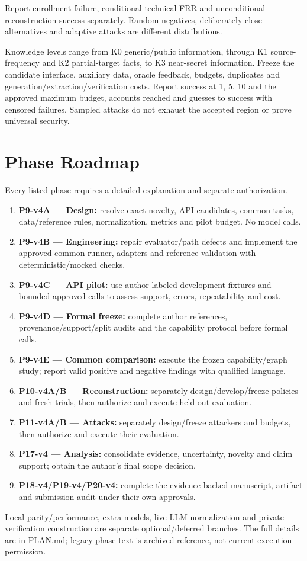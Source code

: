 \documentclass[11pt,a4paper]{article}
\begin{document}
Report enrollment failure, conditional technical FRR and unconditional reconstruction success separately. Random negatives, deliberately close alternatives and adaptive attacks are different distributions.

Knowledge levels range from K0 generic/public information, through K1 source-frequency and K2 partial-target facts, to K3 near-secret information. Freeze the candidate interface, auxiliary data, oracle feedback, budgets, duplicates and generation/extraction/verification costs. Report success at 1, 5, 10 and the approved maximum budget, accounts reached and guesses to success with censored failures. Sampled attacks do not exhaust the accepted region or prove universal security.

\section{Phase Roadmap}
Every listed phase requires a detailed explanation and separate authorization.
\begin{enumerate}
\item \textbf{P9-v4A --- Design:} resolve exact novelty, API candidates, common tasks, data/reference rules, normalization, metrics and pilot budget. No model calls.
\item \textbf{P9-v4B --- Engineering:} repair evaluator/path defects and implement the approved common runner, adapters and reference validation with deterministic/mocked checks.
\item \textbf{P9-v4C --- API pilot:} use author-labeled development fixtures and bounded approved calls to assess support, errors, repeatability and cost.
\item \textbf{P9-v4D --- Formal freeze:} complete author references, provenance/support/split audits and the capability protocol before formal calls.
\item \textbf{P9-v4E --- Common comparison:} execute the frozen capability/graph study; report valid positive and negative findings with qualified language.
\item \textbf{P10-v4A/B --- Reconstruction:} separately design/develop/freeze policies and fresh trials, then authorize and execute held-out evaluation.
\item \textbf{P11-v4A/B --- Attacks:} separately design/freeze attackers and budgets, then authorize and execute their evaluation.
\item \textbf{P17-v4 --- Analysis:} consolidate evidence, uncertainty, novelty and claim support; obtain the author's final scope decision.
\item \textbf{P18-v4/P19-v4/P20-v4:} complete the evidence-backed manuscript, artifact and submission audit under their own approvals.
\end{enumerate}
Local parity/performance, extra models, live LLM normalization and private-verification construction are separate optional/deferred branches. The full details are in PLAN.md; legacy phase text is archived reference, not current execution permission.
\end{document}
